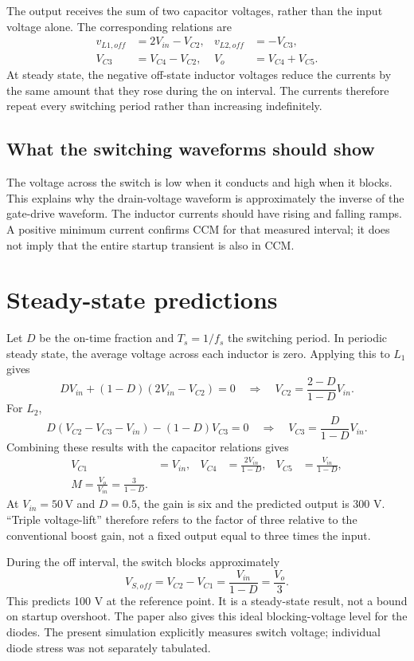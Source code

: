 \documentclass[11pt,a4paper]{article}
\newcommand{\unit}[1]{\,\mathrm{#1}}
\begin{document}
The output receives the sum of two capacitor voltages, rather than the input voltage alone. The corresponding relations are
\begin{align}
 v_{L1,off}&=2V_{in}-V_{C2}, & v_{L2,off}&=-V_{C3},\\
 V_{C3}&=V_{C4}-V_{C2}, & V_o&=V_{C4}+V_{C5}.
\end{align}
At steady state, the negative off-state inductor voltages reduce the currents by the same amount that they rose during the on interval. The currents therefore repeat every switching period rather than increasing indefinitely.
\subsection{What the switching waveforms should show}
The voltage across the switch is low when it conducts and high when it blocks. This explains why the drain-voltage waveform is approximately the inverse of the gate-drive waveform. The inductor currents should have rising and falling ramps. A positive minimum current confirms CCM for that measured interval; it does not imply that the entire startup transient is also in CCM.
\clearpage
\section{Steady-state predictions}
Let $D$ be the on-time fraction and $T_s=1/f_s$ the switching period. In periodic steady state, the average voltage across each inductor is zero. Applying this to $L_1$ gives
\begin{equation}
D V_{in}+(1-D)(2V_{in}-V_{C2})=0
\quad\Rightarrow\quad V_{C2}=\frac{2-D}{1-D}V_{in}.
\end{equation}
For $L_2$,
\begin{equation}
D(V_{C2}-V_{C3}-V_{in})-(1-D)V_{C3}=0
\quad\Rightarrow\quad V_{C3}=\frac{D}{1-D}V_{in}.
\end{equation}
Combining these results with the capacitor relations gives
\begin{align}
V_{C1}&=V_{in}, & V_{C4}&=\frac{2V_{in}}{1-D}, & V_{C5}&=\frac{V_{in}}{1-D},\\
\boxed{M=\frac{V_o}{V_{in}}=\frac{3}{1-D}}.&&&
\end{align}
At $V_{in}=50\unit{V}$ and $D=0.5$, the gain is six and the predicted output is 300 V. ``Triple voltage-lift'' therefore refers to the factor of three relative to the conventional boost gain, not a fixed output equal to three times the input.

During the off interval, the switch blocks approximately
\begin{equation}
V_{S,off}=V_{C2}-V_{C1}=\frac{V_{in}}{1-D}=\frac{V_o}{3}.
\end{equation}
This predicts 100 V at the reference point. It is a steady-state result, not a bound on startup overshoot. The paper also gives this ideal blocking-voltage level for the diodes. The present simulation explicitly measures switch voltage; individual diode stress was not separately tabulated.
\end{document}
